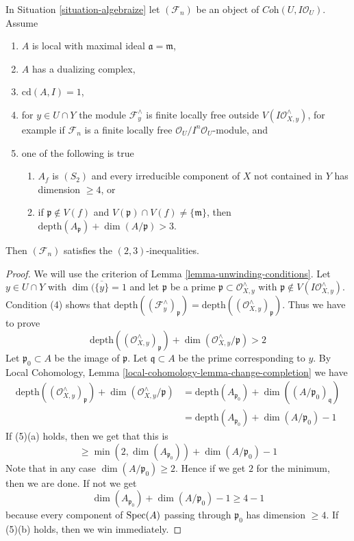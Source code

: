 \begin{lemma}
\label{lemma-unwinding-conditions-bis}
In Situation \ref{situation-algebraize} let $(\mathcal{F}_n)$ be an object
of $\textit{Coh}(U, I\mathcal{O}_U)$. Assume
\begin{enumerate}
\item $A$ is local with maximal ideal $\mathfrak a = \mathfrak m$,
\item $A$ has a dualizing complex,
\item $\text{cd}(A, I) = 1$,
\item for $y \in U \cap Y$ the module $\mathcal{F}_y^\wedge$
is finite locally free outside $V(I\mathcal{O}_{X, y}^\wedge)$,
for example if $\mathcal{F}_n$ is a finite locally free
$\mathcal{O}_U/I^n\mathcal{O}_U$-module, and
\item one of the following is true
\begin{enumerate}
\item $A_f$ is $(S_2)$ and every irreducible component of $X$
not contained in $Y$ has dimension $\geq 4$, or
\item if $\mathfrak p \not \in V(f)$ and
$V(\mathfrak p) \cap V(f) \not = \{\mathfrak m\}$, then
$\text{depth}(A_\mathfrak p) + \dim(A/\mathfrak p) > 3$.
\end{enumerate}
\end{enumerate}
Then $(\mathcal{F}_n)$ satisfies the $(2, 3)$-inequalities.
\end{lemma}

\begin{proof}
We will use the criterion of Lemma \ref{lemma-unwinding-conditions}.
Let $y \in U \cap Y$ with $\dim(\overline{\{y\}} = 1$ and let
$\mathfrak p$ be a prime $\mathfrak p \subset \mathcal{O}_{X, y}^\wedge$ with
$\mathfrak p \not \in V(I\mathcal{O}_{X, y}^\wedge)$.
Condition (4) shows that
$\text{depth}((\mathcal{F}_y^\wedge)_\mathfrak p) =
\text{depth}((\mathcal{O}_{X, y}^\wedge)_\mathfrak p)$.
Thus we have to prove
$$
\text{depth}((\mathcal{O}_{X, y}^\wedge)_\mathfrak p) +
\dim(\mathcal{O}_{X, y}^\wedge/\mathfrak p) > 2
$$
Let $\mathfrak p_0 \subset A$ be the image of $\mathfrak p$.
Let $\mathfrak q \subset A$ be the prime corresponding to $y$.
By Local Cohomology, Lemma
\ref{local-cohomology-lemma-change-completion}
we have
\begin{align*}
\text{depth}((\mathcal{O}_{X, y}^\wedge)_\mathfrak p) +
\dim(\mathcal{O}_{X, y}^\wedge/\mathfrak p)
& =
\text{depth}(A_{\mathfrak p_0}) + \dim((A/\mathfrak p_0)_\mathfrak q) \\
& =
\text{depth}(A_{\mathfrak p_0}) + \dim(A/\mathfrak p_0) - 1
\end{align*}
If (5)(a) holds, then we get that this is
$$
\geq \min(2, \dim(A_{\mathfrak p_0})) + \dim(A/\mathfrak p_0) - 1
$$
Note that in any case $\dim(A/\mathfrak p_0) \geq 2$. Hence if
we get $2$ for the minimum, then we are done. If not we get
$$
\dim(A_{\mathfrak p_0}) + \dim(A/\mathfrak p_0) - 1 \geq 4 - 1
$$
because every component of $\mathop{\mathrm{Spec}}(A)$ passing through $\mathfrak p_0$
has dimension $\geq 4$. If (5)(b) holds, then we win immediately.
\end{proof}

